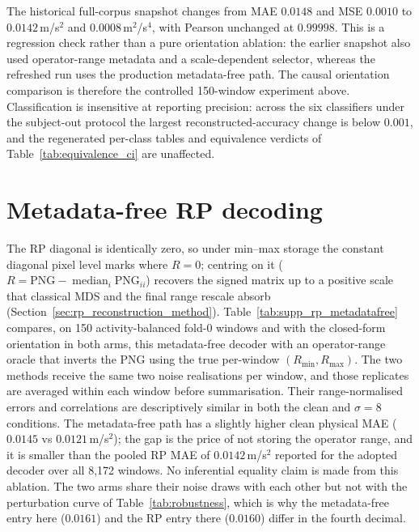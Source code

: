 \documentclass[10pt,a4paper,parskip=half-]{scrartcl}
\begin{document}
The historical full-corpus snapshot changes from MAE $0.0148$ and MSE $0.0010$ to $0.0142$\,m/s$^2$ and $0.0008$\,m$^2$/s$^4$, with Pearson unchanged at $0.99998$. This is a regression check rather than a pure orientation ablation: the earlier snapshot also used operator-range metadata and a scale-dependent selector, whereas the refreshed run uses the production metadata-free path. The causal orientation comparison is therefore the controlled 150-window experiment above. Classification is insensitive at reporting precision: across the six classifiers under the subject-out protocol the largest reconstructed-accuracy change is below $0.001$, and the regenerated per-class tables and equivalence verdicts of Table~\ref{tab:equivalence_ci} are unaffected.

\section{Metadata-free RP decoding}
\label{sec:supp_rp_metadata_free}
The RP diagonal is identically zero, so under min--max storage the constant diagonal pixel level marks where $R=0$; centring on it ($R=\mathrm{PNG}-\operatorname{median}_i\mathrm{PNG}_{ii}$) recovers the signed matrix up to a positive scale that classical MDS and the final range rescale absorb (Section~\ref{sec:rp_reconstruction_method}). Table~\ref{tab:supp_rp_metadatafree} compares, on 150 activity-balanced fold-0 windows and with the closed-form orientation in both arms, this metadata-free decoder with an operator-range oracle that inverts the PNG using the true per-window $(R_{\min},R_{\max})$. The two methods receive the same two noise realisations per window, and those replicates are averaged within each window before summarisation. Their range-normalised errors and correlations are descriptively similar in both the clean and $\sigma=8$ conditions. The metadata-free path has a slightly higher clean physical MAE ($0.0145$ vs $0.0121$\,m/s$^2$); the gap is the price of not storing the operator range, and it is smaller than the pooled RP MAE of $0.0142$\,m/s$^2$ reported for the adopted decoder over all 8,172 windows. No inferential equality claim is made from this ablation. The two arms share their noise draws with each other but not with the perturbation curve of Table~\ref{tab:robustness}, which is why the metadata-free entry here ($0.0161$) and the RP entry there ($0.0160$) differ in the fourth decimal.
\end{document}
